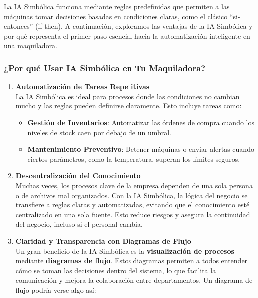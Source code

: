 \documentclass[
  10pt,
  letterpaper,
]{book}
\providecommand{\tightlist}{%
  \setlength{\itemsep}{0pt}\setlength{\parskip}{0pt}}\usepackage{longtable,booktabs,array}
\begin{document}
La IA Simbólica funciona mediante reglas predefinidas que permiten a las
máquinas tomar decisiones basadas en condiciones claras, como el clásico
``si-entonces'' (if-then). A continuación, exploramos las ventajas de la
IA Simbólica y por qué representa el primer paso esencial hacia la
automatización inteligente en una maquiladora.

\subsubsection{¿Por qué Usar IA Simbólica en Tu
Maquiladora?}\label{por-quuxe9-usar-ia-simbuxf3lica-en-tu-maquiladora}

\begin{enumerate}
\def\labelenumi{\arabic{enumi}.}
\item
  \textbf{Automatización de Tareas Repetitivas}\\
  La IA Simbólica es ideal para procesos donde las condiciones no
  cambian mucho y las reglas pueden definirse claramente. Esto incluye
  tareas como:

  \begin{itemize}
  \tightlist
  \item
    \textbf{Gestión de Inventarios}: Automatizar las órdenes de compra
    cuando los niveles de stock caen por debajo de un umbral.
  \item
    \textbf{Mantenimiento Preventivo}: Detener máquinas o enviar alertas
    cuando ciertos parámetros, como la temperatura, superan los límites
    seguros.
  \end{itemize}
\item
  \textbf{Descentralización del Conocimiento}\\
  Muchas veces, los procesos clave de la empresa dependen de una sola
  persona o de archivos mal organizados. Con la IA Simbólica, la lógica
  del negocio se transfiere a reglas claras y automatizadas, evitando
  que el conocimiento esté centralizado en una sola fuente. Esto reduce
  riesgos y asegura la continuidad del negocio, incluso si el personal
  cambia.
\item
  \textbf{Claridad y Transparencia con Diagramas de Flujo}\\
  Un gran beneficio de la IA Simbólica es la \textbf{visualización de
  procesos} mediante \textbf{diagramas de flujo}. Estos diagramas
  permiten a todos entender cómo se toman las decisiones dentro del
  sistema, lo que facilita la comunicación y mejora la colaboración
  entre departamentos. Un diagrama de flujo podría verse algo así:


\end{enumerate}
\end{document}
